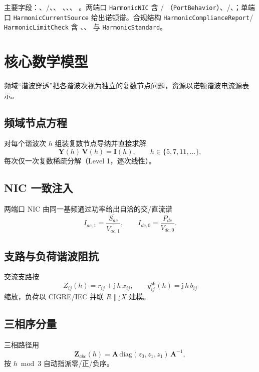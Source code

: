 \documentclass[UTF8,fontset=fandol,a4paper,11pt]{ctexart}
\begin{document}
主要字段：、/、、
、、、
。两端口 \texttt{HarmonicNIC} 含 /
（\texttt{PortBehavior}）、/、；单端口
\texttt{HarmonicCurrentSource} 给出诺顿谱。合规结构 \texttt{HarmonicComplianceReport}/
\texttt{HarmonicLimitCheck} 含 、、 与
\texttt{HarmonicStandard}。

\section{核心数学模型}
频域“谐波穿透”把各谐波次视为独立的复数节点问题，资源以诺顿谐波电流源表示。

\subsection{频域节点方程}
对每个谐波次 $h$ 组装复数节点导纳并直接求解
\begin{equation}
\mathbf{Y}(h)\,\mathbf{V}(h) = \mathbf{I}(h),\qquad h\in\{5,7,11,\dots\},
\end{equation}
每次仅一次复数稀疏分解（Level 1，逐次线性）。

\subsection{NIC 一致注入}
两端口 NIC 由同一基频通过功率给出自洽的交/直流谱
\begin{equation}
I_{ac,1} = \frac{\overline{S_{ac}}}{\overline{V_{ac,1}}},\qquad
I_{dc,0} = \frac{P_{dc}}{V_{dc,0}}.
\end{equation}

\subsection{支路与负荷谐波阻抗}
交流支路按
\begin{equation}
Z_{ij}(h) = r_{ij} + \mathrm{j}\,h\,x_{ij},\qquad
y^{\text{sh}}_{ij}(h) = \mathrm{j}\,h\,b_{ij}
\end{equation}
缩放，负荷以 CIGRE/IEC 并联 $R\parallel\mathrm{j}X$ 建模。

\subsection{三相序分量}
三相路径用
\begin{equation}
\mathbf{Z}_{abc}(h) = \mathbf{A}\,\mathrm{diag}(z_0,z_1,z_1)\,\mathbf{A}^{-1},
\end{equation}
按 $h \bmod 3$ 自动指派零/正/负序。
\end{document}
